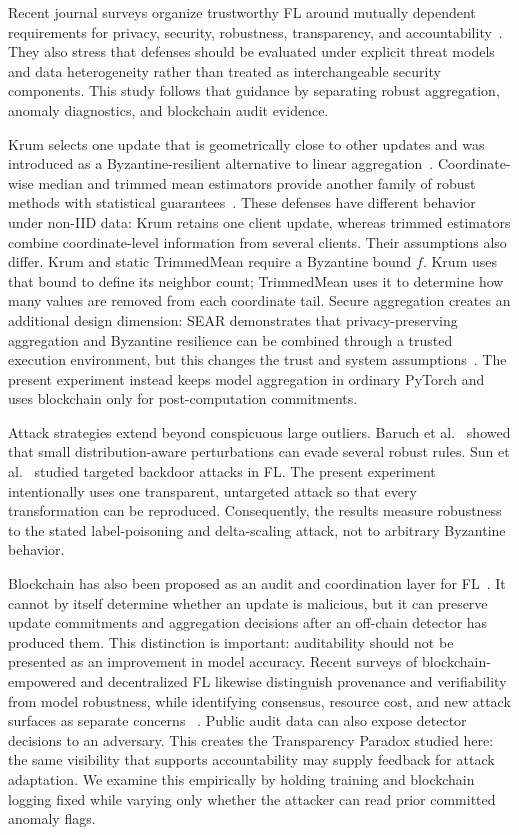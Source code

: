 \documentclass[10pt,letterpaper]{article}
\begin{document}
Recent journal surveys organize trustworthy FL around mutually dependent
requirements for privacy, security, robustness, transparency, and
accountability~\cite{mothukuri2021,tariq2024,hu2024,feng2025}. They also stress
that defenses should be evaluated under explicit threat models and data
heterogeneity rather than treated as interchangeable security components. This
study follows that guidance by separating robust aggregation, anomaly
diagnostics, and blockchain audit evidence.

Krum selects one update that is geometrically close to other updates and was
introduced as a Byzantine-resilient alternative to linear
aggregation~\cite{blanchard2017}. Coordinate-wise median and trimmed mean
estimators provide another family of robust methods with statistical
guarantees~\cite{yin2018}. These defenses have different behavior under non-IID
data: Krum retains one client update, whereas trimmed estimators combine
coordinate-level information from several clients. Their assumptions also
differ. Krum and static TrimmedMean require a Byzantine bound $f$. Krum uses
that bound to define its neighbor count; TrimmedMean uses it to determine how
many values are removed from each coordinate tail.
Secure aggregation creates an additional design dimension: SEAR demonstrates
that privacy-preserving aggregation and Byzantine resilience can be combined
through a trusted execution environment, but this changes the trust and system
assumptions~\cite{zhao2022}. The present experiment instead keeps model
aggregation in ordinary PyTorch and uses blockchain only for post-computation
commitments.

Attack strategies extend beyond conspicuous large outliers. Baruch et
al.~\cite{baruch2019} showed that small distribution-aware perturbations can
evade several robust rules. Sun et al.~\cite{sun2019} studied targeted backdoor
attacks in FL. The present experiment intentionally uses one transparent,
untargeted attack so that every transformation can be reproduced. Consequently,
the results measure robustness to the stated label-poisoning and delta-scaling
attack, not to arbitrary Byzantine behavior.

Blockchain has also been proposed as an audit and coordination layer for
FL~\cite{kim2020,lu2020}. It cannot by itself determine whether an update is
malicious, but it can preserve update commitments and aggregation decisions
after an off-chain detector has produced them. This distinction is important:
auditability should not be presented as an improvement in model accuracy.
Recent surveys of blockchain-empowered and decentralized FL likewise distinguish
provenance and verifiability from model robustness, while identifying consensus,
resource cost, and new attack surfaces as separate concerns
~\cite{zhu2023,hallaji2024}.
Public audit data can also expose detector decisions to an adversary. This
creates the Transparency Paradox studied here: the same visibility that supports
accountability may supply feedback for attack adaptation. We examine this
empirically by holding training and blockchain logging fixed while varying only
whether the attacker can read prior committed anomaly flags.
\end{document}
